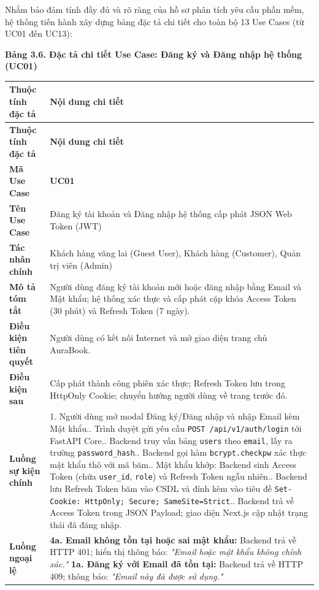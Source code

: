 \documentclass[11pt, a4paper]{report}
\begin{document}
Nhằm bảo đảm tính đầy đủ và rõ ràng của hồ sơ phân tích yêu cầu phần mềm, hệ thống tiến hành xây dựng bảng đặc tả chi tiết cho toàn bộ 13 Use Cases (từ UC01 đến UC13):

\vspace{0.3cm}
\noindent\textbf{Bảng 3.6. Đặc tả chi tiết Use Case: Đăng ký và Đăng nhập hệ thống (UC01)}

\begin{longtable}{p{3.8cm} p{10.5cm}}
\toprule
\textbf{Thuộc tính đặc tả} & \textbf{Nội dung chi tiết} \\
\midrule
\endfirsthead
\toprule
\textbf{Thuộc tính đặc tả} & \textbf{Nội dung chi tiết} \\
\midrule
\endhead
\bottomrule
\endfoot
\textbf{Mã Use Case} & \textbf{UC01} \\
\midrule
\textbf{Tên Use Case} & Đăng ký tài khoản và Đăng nhập hệ thống cấp phát JSON Web Token (JWT) \\
\midrule
\textbf{Tác nhân chính} & Khách hàng vãng lai (Guest User), Khách hàng (Customer), Quản trị viên (Admin) \\
\midrule
\textbf{Mô tả tóm tắt} & Người dùng đăng ký tài khoản mới hoặc đăng nhập bằng Email và Mật khẩu; hệ thống xác thực và cấp phát cặp khóa Access Token (30 phút) và Refresh Token (7 ngày). \\
\midrule
\textbf{Điều kiện tiên quyết} & Người dùng có kết nối Internet và mở giao diện trang chủ AuraBook. \\
\midrule
\textbf{Điều kiện sau} & Cấp phát thành công phiên xác thực; Refresh Token lưu trong HttpOnly Cookie; chuyển hướng người dùng về trang trước đó. \\
\midrule
\textbf{Luồng sự kiện chính} & 
1. Người dùng mở modal Đăng ký/Đăng nhập và nhập Email kèm Mật khẩu.\newline
2. Trình duyệt gửi yêu cầu \texttt{POST /api/v1/auth/login} tới FastAPI Core.\newline
3. Backend truy vấn bảng \texttt{users} theo \texttt{email}, lấy ra trường \texttt{password\_hash}.\newline
4. Backend gọi hàm \texttt{bcrypt.checkpw} xác thực mật khẩu thô với mã băm.\newline
5. Mật khẩu khớp: Backend sinh Access Token (chứa \texttt{user\_id}, \texttt{role}) và Refresh Token ngẫu nhiên.\newline
6. Backend lưu Refresh Token băm vào CSDL và đính kèm vào tiêu đề \texttt{Set-Cookie: HttpOnly; Secure; SameSite=Strict}.\newline
7. Backend trả về Access Token trong JSON Payload; giao diện Next.js cập nhật trạng thái đã đăng nhập. \\
\midrule
\textbf{Luồng ngoại lệ} & 
\textbf{4a. Email không tồn tại hoặc sai mật khẩu:} Backend trả về HTTP 401; hiển thị thông báo: \textit{"Email hoặc mật khẩu không chính xác."}\newline
\textbf{1a. Đăng ký với Email đã tồn tại:} Backend trả về HTTP 409; thông báo: \textit{"Email này đã được sử dụng."} \\
\bottomrule
\end{longtable}
\end{document}
